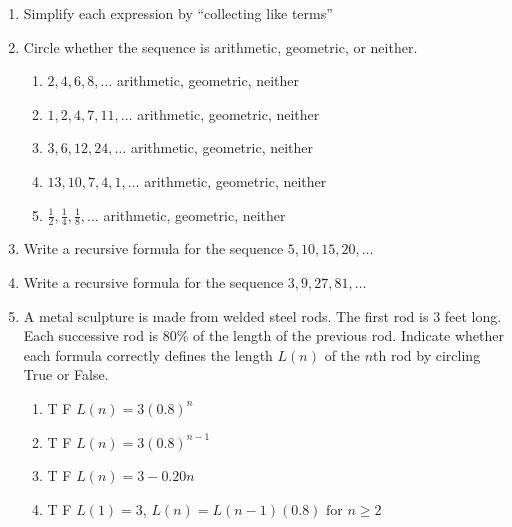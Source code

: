 \documentclass[12pt, twoside]{article}
\begin{document}
\begin{enumerate}[itemsep=0.5cm]
\item Simplify each expression by ``collecting like terms''
\begin{enumerate}[itemsep=2cm]
    \end{enumerate}

\newpage
\item Circle whether the sequence is arithmetic, geometric, or neither.
  \begin{enumerate}[itemsep=0.5cm]
    \item $2, 4, 6, 8, \dots$ \hspace{1.6cm} arithmetic, geometric, neither
    \item $1, 2, 4, 7, 11, \dots$ \hspace{1cm} arithmetic, geometric, neither
    \item $3, 6, 12, 24, \dots$ \hspace{1.2cm} arithmetic, geometric, neither
    \item $13, 10, 7, 4, 1, \dots$ \hspace{0.9cm} arithmetic, geometric, neither
    \item $\displaystyle \frac{1}{2}, \frac{1}{4}, \frac{1}{8}, \dots$ \hspace{1.8cm} arithmetic, geometric, neither
  \end{enumerate}


\item Write a recursive formula for the sequence $5, 10, 15, 20, \dots$ \vspace{3cm}
\item Write a recursive formula for the sequence $3, 9, 27, 81, \dots$ \vspace{3cm}

\item A metal sculpture is made from welded steel rods. The first rod is 3 feet long. Each successive rod is 80\% of the length of the previous rod. Indicate whether each formula correctly defines the length $L(n)$ of the $n$th rod by circling True or False.
  \begin{enumerate}[label=(\alph*)]
    \item T \; F \qquad $L(n) = 3(0.8)^n$
    \item T \; F \qquad $L(n) = 3(0.8)^{n-1}$
    \item T \; F \qquad $L(n) = 3-0.20n$
    \item T \; F \qquad $L(1) = 3$, $L(n) = L(n-1)(0.8) \text{ for } n \ge 2$
  \end{enumerate}


\end{enumerate}
\end{document}
